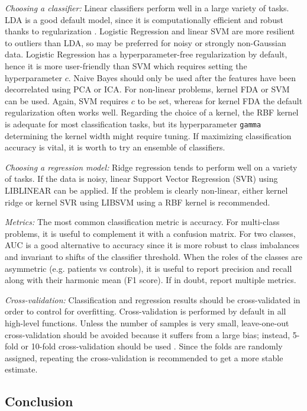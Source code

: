 \documentclass[utf8]{frontiersSCNS} %
\newcommand{\ttt}[1]{\texttt{#1}}
\begin{document}
\textit{Choosing a classifier:} Linear classifiers perform well in a large variety of tasks. LDA is a good default model, since it is computationally efficient and robust thanks to regularization \citep{Blankertz2011}. Logistic Regression and linear SVM are more resilient to outliers than LDA, so may be preferred for noisy or strongly non-Gaussian data. Logistic Regression has a hyperparameter-free regularization by default, hence it is more user-friendly than SVM which requires setting the hyperparameter $c$. Naive Bayes should only be used after the features have been decorrelated using PCA or ICA. For non-linear problems, kernel FDA or SVM can be used. Again, SVM requires $c$ to be set, whereas for kernel FDA the default regularization often works well. Regarding the choice of a kernel, the RBF kernel is adequate for most classification tasks, but its hyperparameter \ttt{gamma} determining the kernel width might require tuning. If maximizing classification accuracy is vital, it is worth to try an ensemble of classifiers.

\textit{Choosing a regression model:} Ridge regression tends to perform well on a variety of tasks. If the data is noisy, linear Support Vector Regression (SVR) using LIBLINEAR can be applied. If the problem is clearly non-linear, either kernel ridge or kernel SVR using LIBSVM using a RBF kernel is recommended.

\textit{Metrics:} The most common classification metric is accuracy. For multi-class problems, it is useful to complement it with a confusion matrix. For two classes, AUC is a good alternative to accuracy since it is more robust to class imbalances and invariant to shifts of the classifier threshold. When the roles of the classes are asymmetric (e.g. patients vs controls), it is useful to report precision and recall along with their harmonic mean (F1 score). If in doubt, report multiple metrics.

\textit{Cross-validation:} Classification and regression results should be cross-validated in order to control for overfitting. Cross-validation is performed by default in all high-level functions. Unless the number of samples is very small, leave-one-out cross-validation should be avoided because it suffers from a large bias; instead, 5-fold or 10-fold cross-validation should be used \citep{James2013}. Since the folds are randomly assigned, repeating the cross-validation is recommended to get a more stable estimate.

\subsection{Conclusion}
\end{document}
